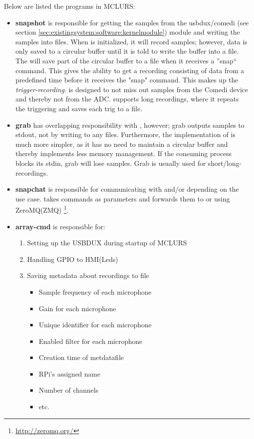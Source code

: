 Below are listed the programs in MCLURS:
\begin{itemize}
	\item \textbf{snapshot} is responsible for getting the samples from the usbdux/comedi (see section \ref{sec:existingsystem:software:kernelmodule}) module and writing the samples into files. When  is initialized, it will record samples; however, data is only saved to a circular buffer until it is told to write the buffer into a file. The  will save part of the circular buffer to a file when it receives a ''snap`` command. This gives the ability to get a recording consisting of data from a predefined time before it receives the "snap" command. This makes up the \textit{trigger-recording}.  is designed to not miss out samples from the Comedi device and thereby not from the ADC.  supports long recordings, where it repeats the triggering and saves each trig to a file.
	
	\item \textbf{grab} has overlapping responsibility with , however; grab outputs samples to stdout, not by writing to any files. Furthermore, the implementation of  is much more simpler, as it has no need to maintain a circular buffer and thereby implements less memory management. If the consuming process blocks its stdin, grab will lose samples. Grab is usually used for short/long-recordings.

	\item  \textbf{snapchat} is responsible for communicating with  and/or  depending on the use case.  takes commands as parameters and forwards them to  or  using ZeroMQ(ZMQ) \footnote{\url{http://zeromq.org/}}.

	\item \textbf{array-cmd} is responsible for:
	\begin{enumerate}	
		\item Setting up the USBDUX during startup of MCLURS 
		\item Handling GPIO to HMI(Leds)
		\item Saving metadata about recordings to file
			\begin{itemize}
				\item Sample frequency of each microphone
				\item Gain for each microphone
				\item Unique identifier for each microphone
				\item Enabled filter for each microphone
				\item Creation time of metdatafile
				\item RPi's assigned name
				\item Number of channels
				\item etc.
			\end{itemize}
		

\end{enumerate}
\end{itemize}

